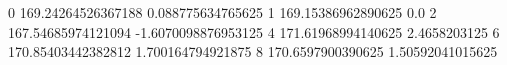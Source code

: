 0 169.24264526367188 0.088775634765625
1 169.15386962890625 0.0
2 167.54685974121094 -1.6070098876953125
4 171.61968994140625 2.4658203125
6 170.85403442382812 1.700164794921875
8 170.6597900390625 1.50592041015625
